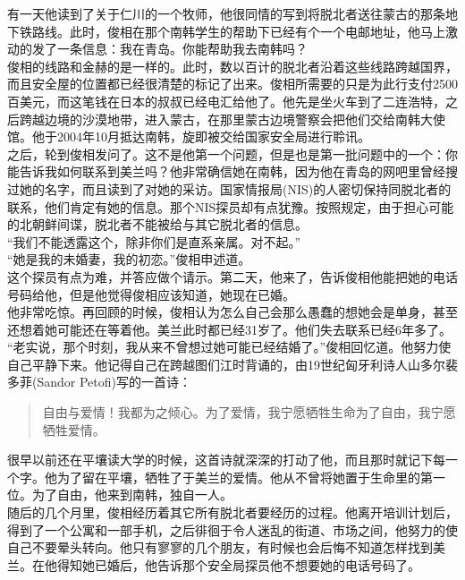 有一天他读到了关于仁川的一个牧师，他很同情的写到将脱北者送往蒙古的那条地下铁路线。此时，俊相在那个南韩学生的帮助下已经有个一个电邮地址，他马上激动的发了一条信息：我在青岛。你能帮助我去南韩吗？\\

俊相的线路和金赫的是一样的。此时，数以百计的脱北者沿着这些线路跨越国界，而且安全屋的位置都已经很清楚的标记了出来。俊相所需要的只是为此行支付2500百美元，而这笔钱在日本的叔叔已经电汇给他了。他先是坐火车到了二连浩特，之后跨越边境的沙漠地带，进入蒙古，在那里蒙古边境警察会把他们交给南韩大使馆。他于2004年10月抵达南韩，旋即被交给国家安全局进行聆讯。\\

之后，轮到俊相发问了。这不是他第一个问题，但是也是第一批问题中的一个：你能告诉我如何联系到美兰吗？他非常确信她在南韩，因为他在青岛的网吧里曾经搜过她的名字，而且读到了对她的采访。国家情报局(NIS)的人密切保持同脱北者的联系，他们肯定有她的信息。那个NIS探员却有点犹豫。按照规定，由于担心可能的北朝鲜间谍，脱北者不能被给与其它脱北者的信息。\\

“我们不能透露这个，除非你们是直系亲属。对不起。”\\

“她是我的未婚妻，我的初恋。”俊相申述道。\\

这个探员有点为难，并答应做个请示。第二天，他来了，告诉俊相他能把她的电话号码给他，但是他觉得俊相应该知道，她现在已婚。\\

他非常吃惊。再回顾的时候，俊相认为怎么自己会那么愚蠢的想她会是单身，甚至还想着她可能还在等着他。美兰此时都已经31岁了。他们失去联系已经6年多了。\\

“老实说，那个时刻，我从来不曾想过她可能已经结婚了。”俊相回忆道。他努力使自己平静下来。他记得自己在跨越图们江时背诵的，由19世纪匈牙利诗人山多尔裴多菲(Sandor Petofi)写的一首诗：\\

\begin{quote}
	自由与爱情！我都为之倾心。为了爱情，我宁愿牺牲生命为了自由，我宁愿牺牲爱情。\\
\end{quote}

很早以前还在平壤读大学的时候，这首诗就深深的打动了他，而且那时就记下每一个字。他为了留在平壤，牺牲了于美兰的爱情。他从不曾将她置于生命里的第一位。为了自由，他来到南韩，独自一人。\\

随后的几个月里，俊相经历着其它所有脱北者要经历的过程。他离开培训计划后，得到了一个公寓和一部手机，之后徘徊于令人迷乱的街道、市场之间，他努力的使自己不要晕头转向。他只有寥寥的几个朋友，有时候也会后悔不知道怎样找到美兰。在他得知她已婚后，他告诉那个安全局探员他不想要她的电话号码了。\\

